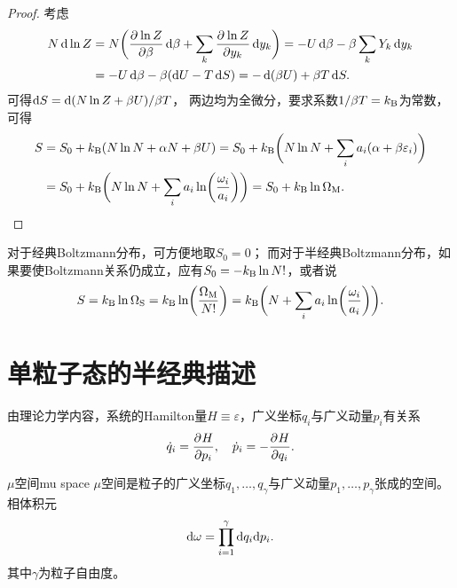 \begin{proof}
	考虑
	\begin{align*}
		N\d\ln Z&=N\biggkh{\pv{\ln Z}\beta\d\beta+\sum_k\pv{\ln Z}{y_k}\d y_k}=-U\d\beta-\beta\sum_k Y_k\d y_k\\
		&=-U\d\beta-\beta(\d U-T\d S)=-\d(\beta U)+\beta T\d S.
	\end{align*}
	可得$\d S=\d(N\ln Z+\beta U)/\beta T$，
	两边均为全微分，要求系数$1/\beta T=\kB$为常数，可得
	\begin{align*}
		S&=S_0+\kB(N\ln N+\alpha N+\beta U)
		=S_0+\kB\biggkh{N\ln N+\sum_i a_i(\alpha+\beta\varepsilon_i)}\\
		&=S_0+\kB\biggkh{N\ln N+\sum_i a_i\ln\biggkh{\frac{\omega_i}{a_i}}}
		=S_0+\kB\ln\Om[M].
		\qedhere
	\end{align*}
\end{proof}

\begin{remark}
	对于经典Boltzmann分布，可方便地取$S_0=0$；
	而对于半经典Boltzmann分布，如果要使Boltzmann关系仍成立，应有$S_0=-\kB\ln N!$，或者说 
	\[
		S=\kB\ln\Om[S]=\kB\ln\biggkh{\frac{\Om[M]}{N!}}
		=\kB\biggkh{N+\sum_i a_i\ln\biggkh{\frac{\omega_i}{a_i}}}.
	\]
\end{remark}


\section{单粒子态的半经典描述}

由理论力学内容，系统的Hamilton量$H\equiv\varepsilon$，广义坐标$q_i$与广义动量$p_i$有关系
\[
	\dot q_i=\pv H{p_i},\quad\dot p_i=-\pv H{q_i}.
\]

\begin{definition}{$\mu$空间}{mu space}
	$\mu$空间是粒子的广义坐标$q_1,\ldots,q_\gamma$与广义动量$p_1,\ldots,p_\gamma$张成的空间。相体积元
	\begin{equation}
		\d\omega=\prod_{i=1}^\gamma\d q_i\nd p_i.
	\end{equation}
	其中$\gamma$为粒子自由度。
\end{definition}

